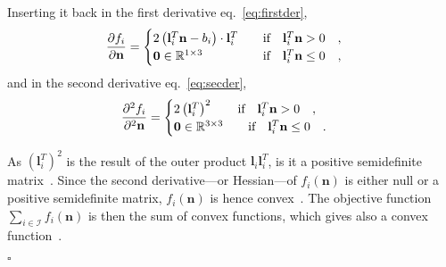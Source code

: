 Inserting it back in the first derivative eq.~\eqref{eq:firstder},
\begin{equation}
\frac{\partial f_i}{\partial {\bf n}} = \begin{cases}
2 \left( \mathbf{l}_i^T \mathbf{n} - b_i \right) \cdot \mathbf{l}_i^T  \qquad\text{if} \quad \mathbf{l}_i^T \mathbf{n} > 0 \quad, \\
\mathbf{0}  \in \mathbb{R}^{1 \times 3} \hfill  \qquad\text{if} \quad \mathbf{l}_i^T \mathbf{n} \leq 0 \quad,
\end{cases} \\
\label{eq:d1ps}
\end{equation}
and in the second derivative eq.~\eqref{eq:secder},
\begin{equation}
\frac{\partial ^2 f_i}{\partial ^2 {\bf n}} = \begin{cases}
2 \left( \mathbf{l}_i^T \right) ^2 \qquad\text{if} \quad \mathbf{l}_i^T \mathbf{n} > 0 \quad, \\
\mathbf{0}  \in \mathbb{R}^{3 \times 3} \hfill  \qquad\text{if} \quad \mathbf{l}_i^T \mathbf{n} \leq 0 \quad.
\end{cases} \\
\label{eq:d2ps}
\end{equation}

As $\left( \mathbf{l}_i^T\right)^2$ is the result of the outer product $\mathbf{l}_i \mathbf{l}_i^T$, is it a positive semidefinite matrix~\cite{schwerdtfeger1950introduction}. Since the second derivative---or Hessian---of $f_i(\mathbf{n})$ is either null or a positive semidefinite matrix, $f_i(\mathbf{n})$ is hence convex~\cite{schwerdtfeger1950introduction}. The objective function $\sum_{i \in \mathcal{I}} f_i(\mathbf{n})$ is then the sum of convex functions, which gives also a convex function~\cite{schwerdtfeger1950introduction}.

\null\hfill$\square$


